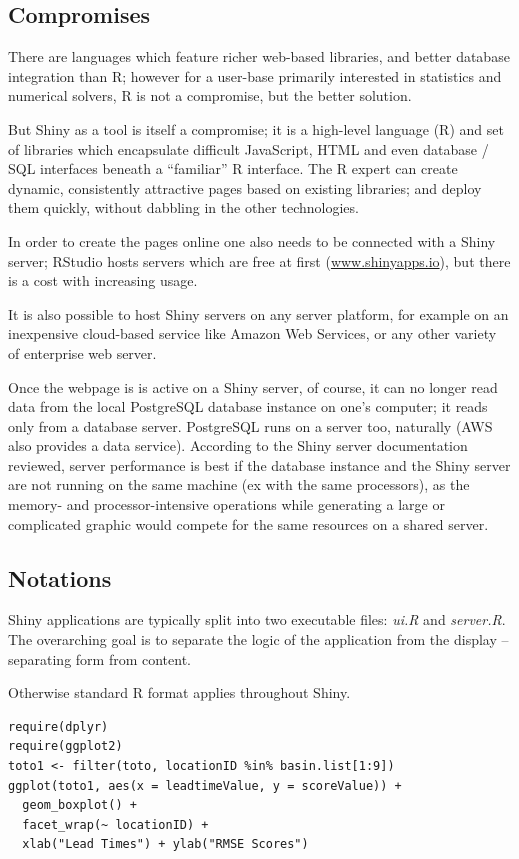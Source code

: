 \documentclass[logos,parttoc,morelanguage=french,morelanguage=german]{orsay-memoire}
\begin{document}
\subsection{Compromises}
There are languages which feature richer web-based libraries, and better database integration than R; however for a user-base primarily interested in statistics and numerical solvers, R is not a compromise, but the better solution.

But Shiny as a tool is itself a compromise; it is a high-level language (R) and set of libraries which encapsulate difficult JavaScript, HTML and even database / SQL interfaces beneath a ``familiar'' R interface. The R expert can create dynamic, consistently attractive pages based on existing libraries; and deploy them quickly, without dabbling in the other technologies.

In order to create the pages online one also needs to be connected with a Shiny server; RStudio hosts servers which are free at first (\href{https://www.shinyapps.io/}{www.shinyapps.io}), but there is a cost with increasing usage.

It is also possible to host Shiny servers on any server platform, for example on an inexpensive cloud-based service like Amazon Web Services, or any other variety of enterprise web server.

Once the webpage is is active on a Shiny server, of course, it can no longer read data from the local PostgreSQL database instance on one's computer; it reads only from a database server. PostgreSQL runs on a server too, naturally (AWS also provides a data service). According to the Shiny server documentation reviewed, server performance is best if the database instance and the Shiny server are not running on the same machine (ex with the same processors), as the memory- and processor-intensive operations while generating a large or complicated graphic would compete for the same resources on a shared server.

\subsection{Notations}
Shiny applications are typically split into two executable files: \textit{ui.R} and \textit{server.R}. The overarching goal is to separate the logic of the application from the display -- separating form from content.

Otherwise standard R format applies throughout Shiny.

\begin{verbatim}
require(dplyr)
require(ggplot2)
toto1 <- filter(toto, locationID %in% basin.list[1:9])
ggplot(toto1, aes(x = leadtimeValue, y = scoreValue)) +
  geom_boxplot() +
  facet_wrap(~ locationID) +
  xlab("Lead Times") + ylab("RMSE Scores")
\end{verbatim}
\end{document}
